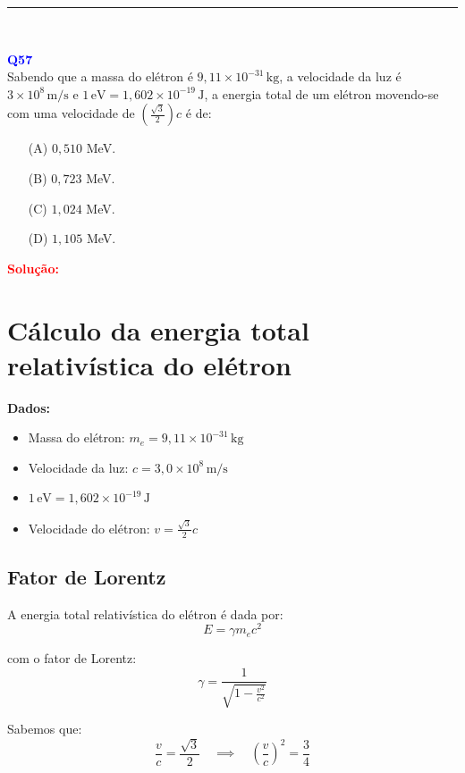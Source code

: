 \documentclass[a4paper,12pt]{article}
\begin{document}
\noindent\rule{\linewidth}{0.6pt}\\

\begin{flushleft}
\textbf{\textcolor{blue}{\Large Q57}}\\
\noindent
Sabendo que a massa do elétron é \( 9,11 \times 10^{-31}\, \mathrm{kg} \), a velocidade da luz é 
\( 3 \times 10^8\, \mathrm{m/s} \) e \( 1\,\mathrm{eV} = 1{,}602 \times 10^{-19}\, \mathrm{J} \), 
a energia total de um elétron movendo-se com uma velocidade de \( \left( \frac{\sqrt{3}}{2} \right) c \) é de:

\begin{itemize}
\item[(A)] $0{,}510$ MeV.
\item[(B)] $0{,}723$ MeV.
\item[(C)] $1{,}024$ MeV.
\item[(D)] $1{,}105$ MeV.
\end{itemize}

\vspace{0.5cm}

\textcolor{red}{\textbf{Solução:}}\\

\section*{Cálculo da energia total relativística do elétron}

\textbf{Dados:}
\begin{itemize}
    \item Massa do elétron: \(m_e = 9{,}11 \times 10^{-31}\, \mathrm{kg}\)
    \item Velocidade da luz: \(c = 3{,}0 \times 10^8\, \mathrm{m/s}\)
    \item \(1\,\mathrm{eV} = 1{,}602 \times 10^{-19}\, \mathrm{J}\)
    \item Velocidade do elétron: \(v = \frac{\sqrt{3}}{2} c\)
\end{itemize}

\subsection*{Fator de Lorentz}

A energia total relativística do elétron é dada por:
\[
E = \gamma m_e c^2
\]

com o fator de Lorentz:
\[
\gamma = \frac{1}{\sqrt{1 - \frac{v^2}{c^2}}}
\]

Sabemos que:
\[
\frac{v}{c} = \frac{\sqrt{3}}{2} \quad \implies \quad \left( \frac{v}{c} \right)^2 = \frac{3}{4}
\]


\end{flushleft}
\end{document}
